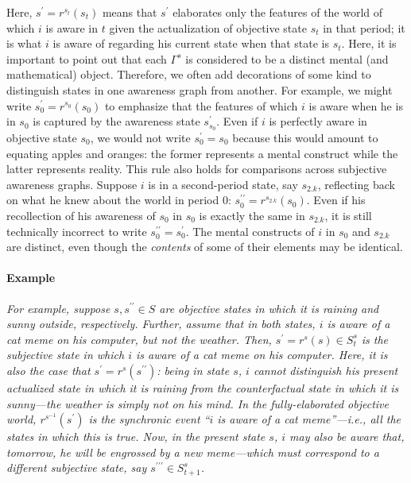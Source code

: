 \documentclass[
11pt,
titlepage,
reqno,
]{article}%
\theoremstyle{definition}
\begin{document}
Here,   $s^{\prime}=r^{s_t}(s_t)$ means that $s^\prime$ elaborates only the features of the world of which $i$ is aware in $t$ given the actualization of objective state $s_t$ in that period; it is what $i$ is aware of regarding his current state when that state is $s_t$.
Here, it is important to point out that each $\Gamma^s$ is considered to be a distinct mental (and mathematical) object.
Therefore, we often add decorations of some kind to distinguish states in one awareness graph from another.
For example, we might write $s^\prime_0=r^{s_0}(s_0)$ to emphasize that the features of which $i$ is aware when he is in $s_0$ is captured by the awareness state $s^\prime_{s_0}$.
Even if $i$ is perfectly aware in objective state $s_0$, we would not write $s^\prime_0=s_0$ because this would amount to equating apples and oranges: the former represents a mental construct while the latter represents reality.
This rule also holds for comparisons across subjective awareness graphs.
Suppose $i$ is in a second-period state, say $s_{2.k}$, reflecting back on what he knew about the world in period 0: $s^{\prime\prime}_0=r^{s_{2.k}}(s_0)$.
Even if his recollection of his awareness of $s_0$ in $s_0$ is exactly the same in $s_{2.k}$, it is still technically incorrect to write $s^{\prime\prime}_0=s^{\prime}_0$. 
The mental constructs of $i$ in $s_0$ and $s_{2.k}$ are distinct, even though the \textit{contents} of some of their elements may be identical.


\paragraph{Example}
\emph
{
	For example, suppose $s,s^{\prime\prime}\in S$ are objective states in which it is raining and sunny outside, respectively.
Further, assume that in both states,  $i$ is aware of a cat meme on his computer, but not the weather. 
Then, $s^{\prime}=r^s(s)\in S^s_t$ is the subjective state in which $i$ is aware of a cat meme on his computer.
Here, it is also the case that $s^{\prime}=r^s(s^{\prime\prime})$: being in state $s$, $i$ cannot distinguish his present actualized  state in which it is raining from the counterfactual state in which it is sunny---the weather is simply not on his mind.
In the fully-elaborated objective world, $r^{s^{-1}}(s^{\prime})$ is the synchronic event ``$i$ is aware of a cat meme''---i.e., all the states in which this is true.
Now, in the present state $s$, $i$ may also be aware that, tomorrow, he will be engrossed by a new meme---which must correspond to a different subjective state, say $s^{\prime\prime\prime}\in S^s_{t+1}$.
}
 
\end{document}
